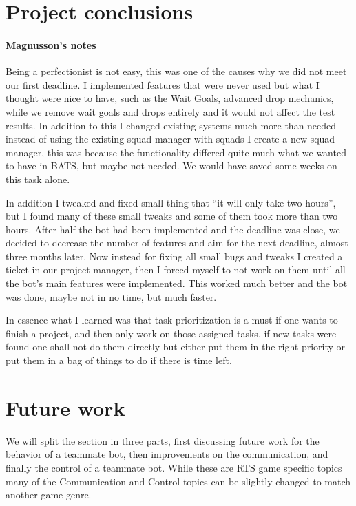 \section{Project conclusions}
\paragraph{Magnusson's notes}
Being a perfectionist is not easy, this was one of the causes why we did not meet our first
deadline. I implemented features that were never used but what I thought were nice to have, such as
the Wait Goals, advanced drop mechanics, while we remove wait goals and drops entirely and it would
not affect the test results.
In addition to this I changed existing systems much more than needed—instead of using the existing squad manager with squads I create a new squad manager, this was because the functionality differed quite much what we wanted to have in BATS, but maybe not needed. We would have saved some weeks on this task alone.

In addition I tweaked and fixed small thing that ``it will only take two hours'', but I found many
of these small tweaks and some of them took more than two hours. After half the bot had been
implemented and the deadline was close, we decided to decrease the number of features and aim for
the next deadline, almost three months later. Now instead for fixing all small bugs and tweaks I
created a ticket in our project manager, then I forced myself to not work on them until all the
bot's main features were implemented. This worked much better and the bot was done, maybe not in no
time, but much faster.

In essence what I learned was that task prioritization is a must if one wants to finish a project,
and then only work on those assigned tasks, if new tasks were found one shall not do them directly
but either put them in the right priority or put them in a bag of things to do if there is time
left.

\section{Future work}
We will split the section in three parts, first discussing future work for the behavior of a teammate bot, then improvements on the communication, and finally the control of a teammate bot. While these are RTS game specific topics many of the Communication and Control topics can be slightly changed to match another game genre.

